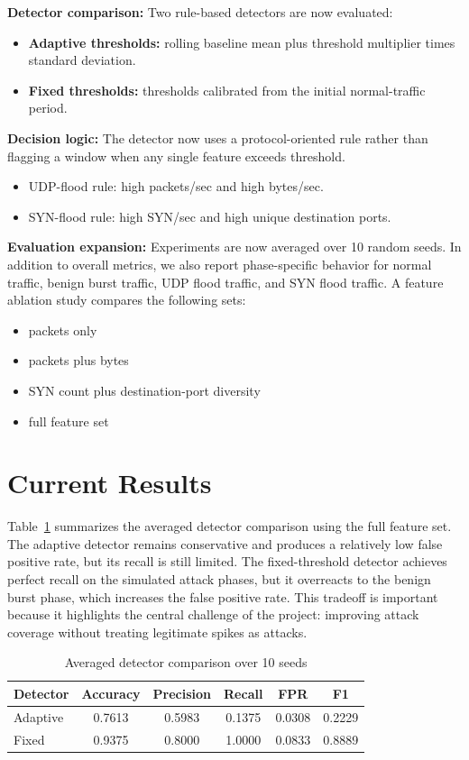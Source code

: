 \documentclass[11pt]{article}
\begin{document}
\textbf{Detector comparison:}
Two rule-based detectors are now evaluated:
\begin{itemize}
  \item \textbf{Adaptive thresholds:} rolling baseline mean plus threshold multiplier times standard deviation.
  \item \textbf{Fixed thresholds:} thresholds calibrated from the initial normal-traffic period.
\end{itemize}

\textbf{Decision logic:}
The detector now uses a protocol-oriented rule rather than flagging a window when any single
feature exceeds threshold.
\begin{itemize}
  \item UDP-flood rule: high packets/sec and high bytes/sec.
  \item SYN-flood rule: high SYN/sec and high unique destination ports.
\end{itemize}

\textbf{Evaluation expansion:}
Experiments are now averaged over 10 random seeds. In addition to overall metrics, we also report
phase-specific behavior for normal traffic, benign burst traffic, UDP flood traffic, and SYN flood
traffic. A feature ablation study compares the following sets:
\begin{itemize}
  \item packets only
  \item packets plus bytes
  \item SYN count plus destination-port diversity
  \item full feature set
\end{itemize}

\section*{Current Results}
Table~\ref{tab:detectors} summarizes the averaged detector comparison using the full feature set.
The adaptive detector remains conservative and produces a relatively low false positive rate, but
its recall is still limited. The fixed-threshold detector achieves perfect recall on the simulated
attack phases, but it overreacts to the benign burst phase, which increases the false positive
rate. This tradeoff is important because it highlights the central challenge of the project:
improving attack coverage without treating legitimate spikes as attacks.

\begin{table}[h]
  \centering
  \caption{Averaged detector comparison over 10 seeds}
  \label{tab:detectors}
  \begin{tabular}{lccccc}
    \toprule
    Detector & Accuracy & Precision & Recall & FPR & F1 \\
    \midrule
    Adaptive & 0.7613 & 0.5983 & 0.1375 & 0.0308 & 0.2229 \\
    Fixed & 0.9375 & 0.8000 & 1.0000 & 0.0833 & 0.8889 \\
    \bottomrule
  \end{tabular}
\end{table}
\end{document}
